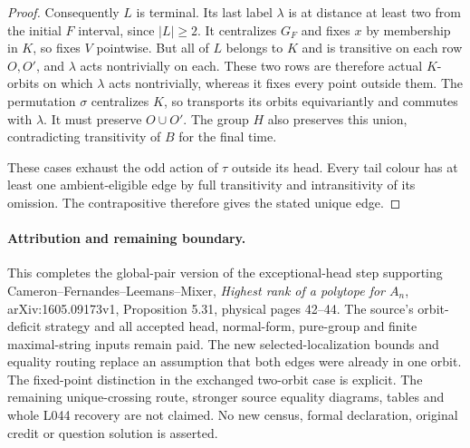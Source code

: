 \documentclass[11pt,a4paper]{article}
\begin{document}
\begin{proof}
Consequently $L$ is terminal. Its last label $\lambda$ is at
distance at least two from the initial $F$ interval, since
$|L|\ge2$. It centralizes $G_F$ and fixes $x$ by membership in
$K$, so fixes $V$ pointwise. But all of $L$ belongs to $K$ and
is transitive on each row $O,O'$, and $\lambda$ acts nontrivially
on each. These two rows are therefore actual $K$-orbits on which
$\lambda$ acts nontrivially, whereas it fixes every point outside
them. The permutation $\sigma$ centralizes $K$, so transports its
orbits equivariantly and commutes with $\lambda$. It must preserve
$O\cup O'$. The group $H$ also preserves this union, contradicting
transitivity of $B$ for the final time.

These cases exhaust the odd action of $\tau$ outside its head.
Every tail colour has at least one ambient-eligible edge by full
transitivity and intransitivity of its omission. The contrapositive
therefore gives the stated unique edge.
\end{proof}

\paragraph{Attribution and remaining boundary.}
This completes the global-pair version of the exceptional-head step
supporting Cameron--Fernandes--Leemans--Mixer,
\emph{Highest rank of a polytope for $A_n$}, arXiv:1605.09173v1,
Proposition 5.31, physical pages 42--44. The source's orbit-deficit
strategy and all accepted head, normal-form, pure-group and finite
maximal-string inputs remain paid. The new selected-localization
bounds and equality routing replace an assumption that both edges
were already in one orbit. The fixed-point distinction in the
exchanged two-orbit case is explicit. The remaining unique-crossing
route, stronger source equality diagrams, tables and whole L044
recovery are not claimed. No new census, formal declaration,
original credit or question solution is asserted.
\end{document}
